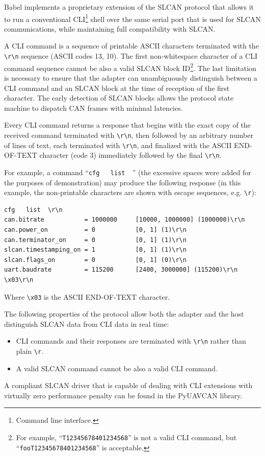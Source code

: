 \documentclass{zubaxdoc}
\begin{document}
Babel implements a proprietary extension of the SLCAN protocol that allows it to run a conventional
CLI\footnote{Command line interface.} shell over the same serial port that is used for SLCAN communications,
while maintaining full compatibility with SLCAN.

A CLI command is a sequence of printable ASCII characters terminated with the
\verb|\r\n| sequence (ASCII codes 13, 10).
The first non-whitespace character of a CLI command sequence cannot be also a valid
SLCAN block ID\footnote{For example, ``\texttt{T12345678401234568}'' is not a valid CLI command,
but ``\texttt{fooT12345678401234568}'' is acceptable.}.
The last limitation is necessary to ensure that the adapter can unambiguously distinguish between
a CLI command and an SLCAN block at the time of reception of the first character.
The early detection of SLCAN blocks allows the protocol state machine to dispatch CAN frames with
minimal latencies.

Every CLI command returns a response that begins with the exact copy of the received command terminated with
\verb|\r\n|,
then followed by an arbitrary number of lines of text,
each terminated with \verb|\r\n|,
and finalized with the ASCII END-OF-TEXT character (code 3) immediately followed by the final
\verb|\r\n|.

For example, a command ``\verb|cfg   list  |'' (the excessive spaces were added for the purposes of demonstration)
may produce the following response (in this example, the non-printable characters are shown with escape sequences,
e.g. \verb|\r|):

\begin{verbatim}
cfg   list  \r\n
can.bitrate           = 1000000     [10000, 1000000] (1000000)\r\n
can.power_on          = 0           [0, 1] (1)\r\n
can.terminator_on     = 0           [0, 1] (1)\r\n
slcan.timestamping_on = 1           [0, 1] (1)\r\n
slcan.flags_on        = 0           [0, 1] (0)\r\n
uart.baudrate         = 115200      [2400, 3000000] (115200)\r\n
\x03\r\n
\end{verbatim}

Where \verb|\x03| is the ASCII END-OF-TEXT character.

The following properties of the protocol allow both the adapter and the host
distinguish SLCAN data from CLI data in real time:
\begin{itemize}
    \item CLI commands and their responses are terminated with \verb|\r\n| rather than plain \verb|\r|.
    \item A valid SLCAN command cannot be also a valid CLI command.
\end{itemize} 
A compliant SLCAN driver that is capable of dealing with CLI extensions with virtually zero performance penalty
can be found in the PyUAVCAN library.
\end{document}
